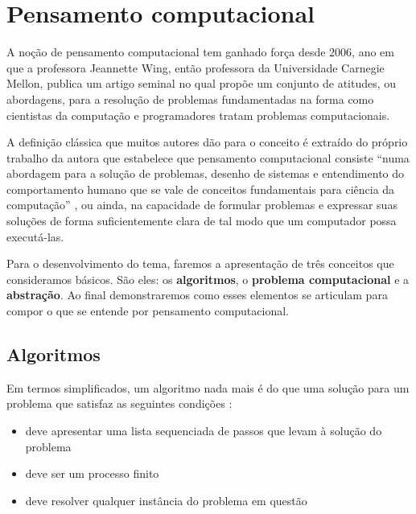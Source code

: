 
\chapter{Pensamento computacional}\label{pensamento-computacional}

A noção de pensamento computacional tem ganhado força desde 2006, ano em que a professora Jeannette Wing, então professora da Universidade Carnegie Mellon, publica um artigo seminal no qual propõe um conjunto de atitudes, ou abordagens, para a resolução de problemas fundamentadas na forma como cientistas da computação e programadores tratam problemas computacionais. 

A definição clássica que muitos autores dão para o conceito é extraído do próprio trabalho da autora que estabelece que pensamento computacional consiste ``numa abordagem para a solução de problemas, desenho de sistemas e entendimento do comportamento humano que se vale de conceitos fundamentais para ciência da computação'' \cite[Tradução nossa]{wing2006}, ou ainda, na capacidade de formular problemas e expressar suas soluções de forma suficientemente clara de tal modo que um computador possa executá-las.

Para o desenvolvimento do tema, faremos a apresentação de três conceitos que consideramos básicos. São eles: os \textbf{algoritmos}, o \textbf{problema computacional} e a \textbf{abstração}. Ao final demonstraremos como esses elementos se articulam para compor o que se entende por pensamento computacional. 


\section{Algoritmos}\label{sec:algoritmo}

Em termos simplificados, um algoritmo nada mais é do que uma solução para um problema que satisfaz as seguintes condições \cite{Piwek2016}:

\begin{itemize}
	\item deve apresentar uma lista sequenciada de passos que levam à solução do problema 
	\item deve ser um processo finito
	\item deve resolver qualquer instância do problema em questão
\end{itemize}

